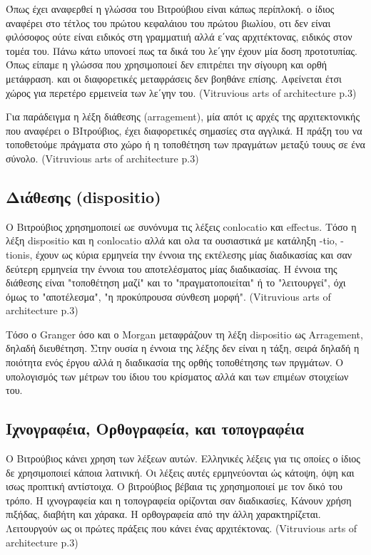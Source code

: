   Όπως έχει αναφερθεί η γλώσσα του Βιτρούβιου είναι κάπως περίπλοκή. ο ίδιος αναφέρει στο τέτλος του πρώτου κεφαλάιου του πρώτου βιωλίου, οτι δεν είναι φιλόσοφος ούτε είναι ειδικός στη γραμματιιή αλλά ε΄νας αρχιτέκτονας, ειδικός στον τομέα του. Πάνω κάτω υπονοεί πως τα δικά του λε΄γην έχουν μία δοση προτοτυπίας. Όπως είπαμε η γλώσσα που χρησιμοποιεί δεν επιτρέπει την σίγουρη και ορθή μετάφραση. και οι διαφορετικές μεταφράσεις δεν βοηθάνε επίσης. Αφείνεται έτσι χώρος για περετέρο ερμεινεία των λε΄γην του. (Vitruvious arts of architecture p.3)
  
  Για παράδειγμα η λέξη διάθεσης (arragement), μία απότ ις αρχές της αρχιτεκτονικής που αναφέρει ο ΒΙτρούβιος, έχει διαφορετικές σημασίες στα αγγλικά. Η πράξη του να τοποθετούμε πράγματα στο χώρο ή η τοποθέτηση των πραγμάτων μεταξύ τουυς σε ένα σύνολο. (Vitruvious arts of architecture p.3)  
  
\subsection{Διάθεσης (dispositio)}
  
  Ο Βιτρούβιος χρησημοποιεί ωε συνόνυμα τις λέξεις conlocatio και effectus. Τόσο η λέξη dispositio και η conlocatio αλλά και ολα τα ουσιαστικά με κατάληξη -tio, -tionis, έχουν ως κύρια ερμηνεία την έννοια της εκτέλεσης μίας διαδικασίας και σαν δεύτερη ερμηνεία την έννοια του αποτελέσματος μίας διαδικασίας. Η έννοια της διάθεσης είναι "τοποθέτηση μαζί" και το "πραγματοποιείται" ή το "λειτουργεί", όχι όμως το "αποτέλεσμα", "η προκύπρουσα σύνθεση μορφή". (Vitruvious arts of architecture p.3)
  
  Τόσο ο Granger όσο και ο Morgan μεταφράζουν τη λέξη dispositio ως Arragement, δηλαδή διευθέτηση. Στην ουσία η έννοια της λέξης δεν είναι η τάξη, σειρά δηλαδή η ποιότητα ενός έργου αλλά η διαδικασία της ορθής τοποθέτησης των πργμάτων. Ο υπολογισμός των μέτρων του ίδιου του κρίσματος αλλά και των επιμέων στοιχείων του.
  
\subsection{Ιχνογραφέια, Ορθογραφεία, και τοπογραφέια}
  
  Ο Βιτρούβιος κάνει χρηση των λέξεων αυτών. Ελληνικές λέξεις για τις οποίες ο ίδιος δε χρησιμοποιεί κάποια λατινική. Οι λέξεις αυτές ερμηνεύονται ώς κάτοψη, όψη και ισως προπτική αντίστοιχα. Ο βιτρούβιος βέβαια τις χρησημοποιεί με τον δικό του τρόπο. Η ιχνογραφεία και η τοπογραφεία ορίζονται σαν διαδικασίες, Κάνουν χρήση πιξήδας, διαβήτη και χάρακα. Η ορθογραφεία από την άλλη χαρακτηρίζεται. Λειτουργούν ως οι πρώτες πράξεις που κάνει ένας αρχιτέκτονας. (Vitruvious arts of architecture p.3)
  
